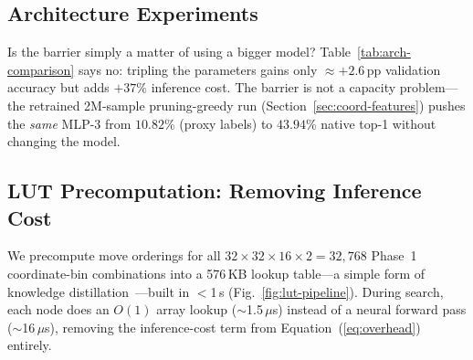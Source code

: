 \documentclass[graybox]{svmult}
\begin{document}
\subsection{Architecture Experiments}
\label{sec:arch-comparison}

Is the barrier simply a matter of using a bigger model? Table~\ref{tab:arch-comparison} says no: tripling the parameters gains only $\approx$$+2.6$\,pp validation accuracy but adds $+37\%$ inference cost. The barrier is not a capacity problem---the retrained 2M-sample pruning-greedy run (Section~\ref{sec:coord-features}) pushes the \emph{same} MLP-3 from $10.82\%$ (proxy labels) to $43.94\%$ native top-1 without changing the model.

\begin{table}[!t]
\centering
\caption{Larger models: more accuracy at higher cost (100K samples, coord.\ features).}
\label{tab:arch-comparison}
\end{table}



\subsection{LUT Precomputation: Removing Inference Cost}
\label{sec:lut}

We precompute move orderings for all $32 \times 32 \times 16 \times 2 = 32{,}768$ Phase~1 coordinate-bin combinations into a 576\,KB lookup table---a simple form of knowledge distillation~\cite{hinton2015}---built in $<$1\,s (Fig.~\ref{fig:lut-pipeline}). During search, each node does an $O(1)$ array lookup ($\sim$1.5\,$\mu$s) instead of a neural forward pass ($\sim$16\,$\mu$s), removing the inference-cost term from Equation~(\ref{eq:overhead}) entirely.
\end{document}
